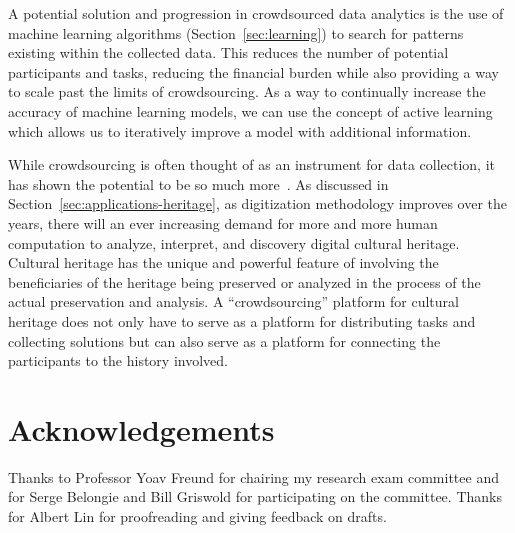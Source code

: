 \documentclass[10pt,twocolumn]{article}
\begin{document}
A potential solution and progression in crowdsourced data analytics is the use 
of machine learning algorithms (Section~\ref{sec:learning}) to search for 
patterns existing within the collected data. This reduces the number of 
potential participants and tasks, reducing the financial burden while also 
providing a way to scale past the limits of crowdsourcing. As a way to 
continually increase the accuracy of machine learning models, we can use the 
concept of active learning which allows us to iteratively improve a model with 
additional information.

While crowdsourcing is often thought of as an instrument for data collection, it 
has shown the potential to be so much more~\cite{Owens2013}. As discussed in 
Section~\ref{sec:applications-heritage}, as digitization methodology improves 
over the years, there will an ever increasing demand for more and more human 
computation to analyze, interpret, and discovery digital cultural heritage. 
Cultural heritage has the unique and powerful feature of involving the beneficiaries of the heritage being preserved or analyzed in the process of the actual preservation and analysis. A ``crowdsourcing'' platform for cultural heritage does not only have to serve as a platform for distributing tasks and collecting solutions but can also serve as a platform for connecting the participants to the history involved.

\section{Acknowledgements}
Thanks to Professor Yoav Freund for chairing my research exam committee and 
for Serge Belongie and Bill Griswold for participating on the committee. Thanks
for Albert Lin for proofreading and giving feedback on drafts.



\end{document}
